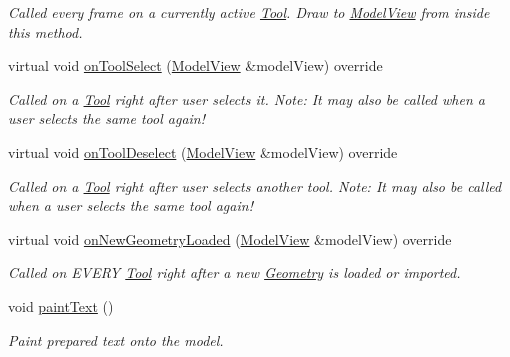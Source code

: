 \begin{DoxyCompactItemize}
\begin{DoxyCompactList}\small\item\em Called every frame on a currently active \mbox{\hyperlink{classpepr3d_1_1_tool}{Tool}}. Draw to \mbox{\hyperlink{classpepr3d_1_1_model_view}{Model\+View}} from inside this method. \end{DoxyCompactList}\item 
\mbox{\label{classpepr3d_1_1_text_editor_a2e868d665405249a775466848e5ac6ad}} 
virtual void \mbox{\hyperlink{classpepr3d_1_1_text_editor_a2e868d665405249a775466848e5ac6ad}{on\+Tool\+Select}} (\mbox{\hyperlink{classpepr3d_1_1_model_view}{Model\+View}} \&model\+View) override
\begin{DoxyCompactList}\small\item\em Called on a \mbox{\hyperlink{classpepr3d_1_1_tool}{Tool}} right after user selects it. Note\+: It may also be called when a user selects the same tool again! \end{DoxyCompactList}\item 
\mbox{\label{classpepr3d_1_1_text_editor_a20b497c331cb642819f366b4689aff1b}} 
virtual void \mbox{\hyperlink{classpepr3d_1_1_text_editor_a20b497c331cb642819f366b4689aff1b}{on\+Tool\+Deselect}} (\mbox{\hyperlink{classpepr3d_1_1_model_view}{Model\+View}} \&model\+View) override
\begin{DoxyCompactList}\small\item\em Called on a \mbox{\hyperlink{classpepr3d_1_1_tool}{Tool}} right after user selects another tool. Note\+: It may also be called when a user selects the same tool again! \end{DoxyCompactList}\item 
\mbox{\label{classpepr3d_1_1_text_editor_a0c7d5a45e94fd87a930b127c1f816deb}} 
virtual void \mbox{\hyperlink{classpepr3d_1_1_text_editor_a0c7d5a45e94fd87a930b127c1f816deb}{on\+New\+Geometry\+Loaded}} (\mbox{\hyperlink{classpepr3d_1_1_model_view}{Model\+View}} \&model\+View) override
\begin{DoxyCompactList}\small\item\em Called on E\+V\+E\+RY \mbox{\hyperlink{classpepr3d_1_1_tool}{Tool}} right after a new \mbox{\hyperlink{classpepr3d_1_1_geometry}{Geometry}} is loaded or imported. \end{DoxyCompactList}\item 
\mbox{\label{classpepr3d_1_1_text_editor_a477667ab0ee9ea117e196d0b045d69b1}} 
void \mbox{\hyperlink{classpepr3d_1_1_text_editor_a477667ab0ee9ea117e196d0b045d69b1}{paint\+Text}} ()
\begin{DoxyCompactList}\small\item\em Paint prepared text onto the model. \end{DoxyCompactList}\end{DoxyCompactItemize}
